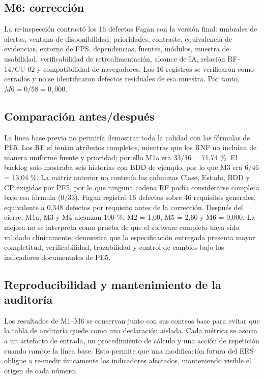 \documentclass[12pt,a4paper]{article}
\begin{document}
\subsection{M6: corrección}
La re-inspección contrastó los 16 defectos Fagan con la versión final: umbrales de alertas, ventana de disponibilidad, prioridades, contraste, equivalencia de evidencias, entorno de FPS, dependencias, fuentes, módulos, muestra de usabilidad, verificabilidad de retroalimentación, alcance de IA, relación RF-14/CU-02 y compatibilidad de navegadores. Los 16 registros se verificaron como cerrados y no se identificaron defectos residuales de esa muestra. Por tanto, $M6 = 0/58 = 0,000$.

\subsection{Comparación antes/después}
La línea base previa no permitía demostrar toda la calidad con las fórmulas de PE5. Los RF sí tenían atributos completos, mientras que los RNF no incluían de manera uniforme fuente y prioridad; por ello M1a era 33/46 = 71,74 \%. El backlog solo mostraba seis historias con BDD de ejemplo, por lo que M3 era 6/46 = 13,04 \%. La matriz anterior no contenía las columnas Clase, Estado, BDD y CP exigidas por PE5, por lo que ninguna cadena RF podía considerarse completa bajo esa fórmula (0/33). Fagan registró 16 defectos sobre 46 requisitos generales, equivalente a 0,348 defectos por requisito antes de la corrección. Después del cierre, M1a, M3 y M4 alcanzan 100 \%, M2 = 1,00, M5 = 2,60 y M6 = 0,000. La mejora no se interpreta como prueba de que el software completo haya sido validado clínicamente; demuestra que la especificación entregada presenta mayor completitud, verificabilidad, trazabilidad y control de cambios bajo los indicadores documentales de PE5.


\subsection{Reproducibilidad y mantenimiento de la auditoría}
Los resultados de M1--M6 se conservan junto con sus conteos base para evitar que la tabla de auditoría quede como una declaración aislada. Cada métrica se asocia a un artefacto de entrada, un procedimiento de cálculo y una acción de repetición cuando cambie la línea base. Esto permite que una modificación futura del ERS obligue a re-medir únicamente los indicadores afectados, manteniendo visible el origen de cada número.
\end{document}
